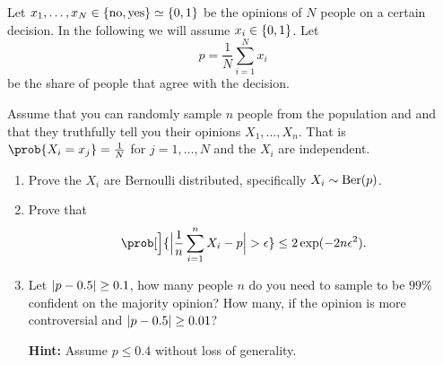 \begin{exercise}[subtitle={Single issue polling \Coffeecup}]
    \label{ex: single issue polling} 
    Let \(x_1,\ldots, x_N \in \{\text{no}, \text{yes}\} \simeq \{0,1\}\) be the
    opinions of \(N\) people on a certain decision. In the following we will
    assume \(x_i \in \{0,1\}\). Let
    \[
        p = \frac1N\sum_{i=1}^N x_i
    \]
    be the share of people that agree with the decision.

    Assume that you can randomly sample \(n\) people from the population and
    and that they truthfully tell you their opinions \(X_1, \dots, X_n\).  That
    is \(\prob{X_i = x_j} = \frac1N\) for \(j=1, \ldots, N\) and the \(X_i\) are
    independent.
    \begin{enumerate}[label=(\alph*), noitemsep]
        \item\label{it: (single issue polling) distribution}
         Prove the \(X_i\) are Bernoulli distributed, specifically \(X_i \sim \mathrm{Ber}(p)\). 

        \item\label{it: (single issue polling) PAC bound}
        Prove that
        \[
            \prob[\Big]{\abs[\Big]{\frac1n \sum_{i=1}^n X_i - p} > \epsilon}
            \le 2\exp(-2n \epsilon^2).
        \]

        \item\label{it: (single issue polling) sample complexity}
        Let \(\lvert p - 0.5\rvert \ge 0.1\), how many people \(n\) do you need to sample to
        be \(99\%\) confident on the majority opinion? How many, if the opinion is more
        controversial and \(\lvert p - 0.5\rvert \ge 0.01\)?

        \textbf{Hint:} Assume \(p \le 0.4\) without loss of generality.
    \end{enumerate}
\end{exercise}

